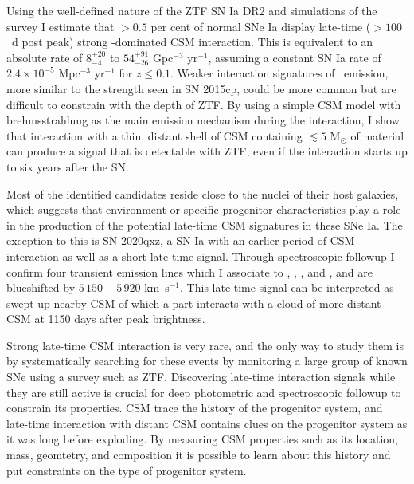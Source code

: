 \begin{abstracts}
Using the well-defined nature of the ZTF SN Ia DR2 and simulations of the survey I estimate that $>0.5$ per cent of normal SNe Ia display late-time ($> 100$~d post peak) strong \Halpha-dominated CSM interaction. This is equivalent to an absolute rate of $8^{+20}_{-4}$ to $54^{+91}_{-26}$ Gpc$^{-3}$ yr$^{-1}$, assuming a constant SN Ia rate of $2.4 \times 10^{-5}$ Mpc$^{-3}$ yr$^{-1}$ for $z \leq 0.1$. Weaker interaction signatures of \Halpha\ emission, more similar to the strength seen in SN 2015cp, could be more common but are difficult to constrain with the depth of ZTF. By using a simple CSM model with brehmsstrahlung as the main emission mechanism during the interaction, I show that interaction with a thin, distant shell of CSM containing $\lesssim5$ M$_\odot$ of material can produce a signal that is detectable with ZTF, even if the interaction starts up to six years after the SN.

Most of the identified candidates reside close to the nuclei of their host galaxies, which suggests that environment or specific progenitor characteristics play a role in the production of the potential late-time CSM signatures in these SNe Ia. The exception to this is SN 2020qxz, a SN Ia with an earlier period of CSM interaction as well as a short late-time signal. Through spectroscopic followup I confirm four transient emission lines which I associate to \Hbeta, \CaII, \NI, and \KI, and are blueshifted by $5\,150 - 5\,920$ km~s$^{-1}$. This late-time signal can be interpreted as swept up nearby CSM of which a part interacts with a cloud of more distant CSM at 1150 days after peak brightness.

Strong late-time CSM interaction is very rare, and the only way to study them is by systematically searching for these events by monitoring a large group of known SNe using a survey such as ZTF. Discovering late-time interaction signals while they are still active is crucial for deep photometric and spectroscopic followup to constrain its properties. CSM trace the history of the progenitor system, and late-time interaction with distant CSM contains clues on the progenitor system as it was long before exploding. By measuring CSM properties such as its location, mass, geomtetry, and composition it is possible to learn about this history and put constraints on the type of progenitor system.

\end{abstracts}


\restoregeometry



